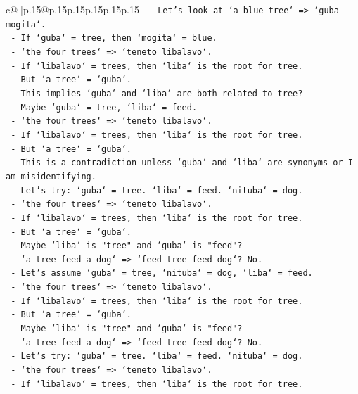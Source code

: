 \documentclass{article}
\begin{document}
{\begin{supertabular}{c@{$\;$}|p{.15\linewidth}@{}p{.15\linewidth}p{.15\linewidth}p{.15\linewidth}p{.15\linewidth}p{.15\linewidth}}
{{{\texttt{  {-} Let's look at `a blue tree` => `guba mogita`.} \\
\texttt{  {-} If `guba` = tree, then `mogita` = blue.} \\
\texttt{  {-} `the four trees` => `teneto libalavo`.} \\
\texttt{  {-} If `libalavo` = trees, then `liba` is the root for tree.} \\
\texttt{  {-} But `a tree` = `guba`.} \\
\texttt{  {-} This implies `guba` and `liba` are both related to tree?} \\
\texttt{  {-} Maybe `guba` = tree, `liba` = feed.} \\
\texttt{  {-} `the four trees` => `teneto libalavo`.} \\
\texttt{  {-} If `libalavo` = trees, then `liba` is the root for tree.} \\
\texttt{  {-} But `a tree` = `guba`.} \\
\texttt{  {-} This is a contradiction unless `guba` and `liba` are synonyms or I am misidentifying.} \\
\texttt{  {-} Let's try: `guba` = tree. `liba` = feed. `nituba` = dog.} \\
\texttt{  {-} `the four trees` => `teneto libalavo`.} \\
\texttt{  {-} If `libalavo` = trees, then `liba` is the root for tree.} \\
\texttt{  {-} But `a tree` = `guba`.} \\
\texttt{  {-} Maybe `liba` is "tree" and `guba` is "feed"?} \\
\texttt{  {-} `a tree feed a dog` => `feed tree feed dog`? No.} \\
\texttt{  {-} Let's assume `guba` = tree, `nituba` = dog, `liba` = feed.} \\
\texttt{  {-} `the four trees` => `teneto libalavo`.} \\
\texttt{  {-} If `libalavo` = trees, then `liba` is the root for tree.} \\
\texttt{  {-} But `a tree` = `guba`.} \\
\texttt{  {-} Maybe `liba` is "tree" and `guba` is "feed"?} \\
\texttt{  {-} `a tree feed a dog` => `feed tree feed dog`? No.} \\
\texttt{  {-} Let's try: `guba` = tree. `liba` = feed. `nituba` = dog.} \\
\texttt{  {-} `the four trees` => `teneto libalavo`.} \\
\texttt{  {-} If `libalavo` = trees, then `liba` is the root for tree.} \\
}}}
\end{supertabular}}
\end{document}
